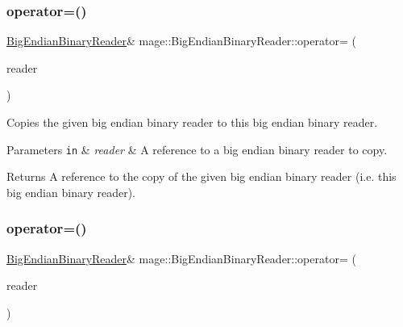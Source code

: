 \subsubsection{\texorpdfstring{operator=()}{operator=()}\hspace{0.1cm}{\footnotesize\ttfamily [1/2]}}
{\footnotesize\ttfamily \hyperlink{classmage_1_1_big_endian_binary_reader}{Big\+Endian\+Binary\+Reader}\& mage\+::\+Big\+Endian\+Binary\+Reader\+::operator= (\begin{DoxyParamCaption}\item[{const \hyperlink{classmage_1_1_big_endian_binary_reader}{Big\+Endian\+Binary\+Reader} \&}]{reader }\end{DoxyParamCaption})\hspace{0.3cm}{\ttfamily [delete]}}

Copies the given big endian binary reader to this big endian binary reader.


\begin{DoxyParams}[1]{Parameters}
\mbox{\tt in}  & {\em reader} & A reference to a big endian binary reader to copy. \\
\hline
\end{DoxyParams}
\begin{DoxyReturn}{Returns}
A reference to the copy of the given big endian binary reader (i.\+e. this big endian binary reader). 
\end{DoxyReturn}
\hypertarget{classmage_1_1_big_endian_binary_reader_a9e2e0dd62afff04774d0246f7e5e4ce4}{}\label{classmage_1_1_big_endian_binary_reader_a9e2e0dd62afff04774d0246f7e5e4ce4} 
\subsubsection{\texorpdfstring{operator=()}{operator=()}\hspace{0.1cm}{\footnotesize\ttfamily [2/2]}}
{\footnotesize\ttfamily \hyperlink{classmage_1_1_big_endian_binary_reader}{Big\+Endian\+Binary\+Reader}\& mage\+::\+Big\+Endian\+Binary\+Reader\+::operator= (\begin{DoxyParamCaption}\item[{\hyperlink{classmage_1_1_big_endian_binary_reader}{Big\+Endian\+Binary\+Reader} \&\&}]{reader }\end{DoxyParamCaption})\hspace{0.3cm}{\ttfamily [delete]}}

